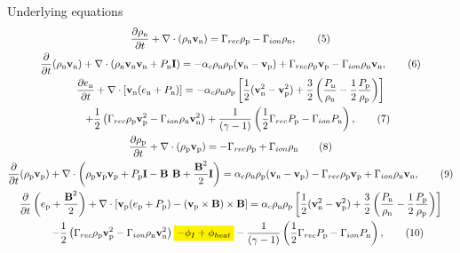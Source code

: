 \documentclass[10pt,aspectratio=169,usenames,dvipsnames]{beamer}
\newcommand{\mathcolorbox}[2]{\colorbox{#1}{$\displaystyle #2$}}
\begin{document}
\begin{frame}{Underlying equations}
\footnotesize
\begin{gather}
\frac{\partial \rho _{\text{n}}}{\partial t} + \nabla \cdot (\rho _{\text{n}} \textbf{v}_{\text{n}})= \Gamma _{rec} \rho _{\rm p} - \Gamma _{ion} \rho _{\rm n}, \label{eqn:neutral1}\tag{5} \\
\frac{\partial}{\partial t}(\rho _{\text{n}} \textbf{v}_{\text{n}}) + \nabla \cdot (\rho _{\text{n}} \textbf{v}_{\text{n}} \textbf{v}_{\text{n}} + P_{\text{n}} \textbf{I}) = -\alpha _c \rho_{\text{n}} \rho_{\text{p}} (\textbf{v}_{\text{n}}-\textbf{v}_{\text{p}}) + \Gamma _{rec} \rho _{\rm p} \textbf{v}_{\rm p} - \Gamma _{ion} \rho_{\rm n} \textbf{v}_{\rm n},\tag{6} \\
\frac{\partial e_{\text{n}}}{\partial t} + \nabla \cdot \left[\textbf{v}_{\text{n}} (e_{\text{n}} +P_{\text{n}}) \right] = -\alpha _c \rho _{\text{n}} \rho _{\text{p}} \left[ \frac{1}{2} (\textbf{v}_{\text{n}} ^2 - \textbf{v}_{\text{p}} ^2)+ \frac{3}{2} \left(\frac{P_{\rm n}}{\rho_{\rm n}}-\frac{1}{2}\frac{P_{\rm p}}{\rho_{\rm p}}\right) \right] \nonumber \\ \hspace{0.5cm}+ \frac{1}{2} \left( \Gamma _{rec} \rho _{\rm p} \textbf{v}_{\rm p} ^2 - \Gamma _{ion} \rho _{\rm n} \textbf{v}_{\rm n} ^2 \right) +\frac{1}{ (\gamma-1)} \left( \frac{1}{2} \Gamma _{rec} P_{\rm p} -\Gamma _{ion} P_{\rm n} \right), \tag{7}\\
\frac{\partial \rho _{\text{p}}}{\partial t} + \nabla \cdot (\rho_{\text{p}} \textbf{v}_{\text{p}}) = - \Gamma _{rec} \rho _{\rm p} + \Gamma _{ion} \rho _{\rm n} \label{eqn:plasma1}\tag{8}\\
\frac{\partial}{\partial t} (\rho_{\text{p}} \textbf{v}_{\text{p}})+ \nabla \cdot \left( \rho_{\text{p}} \textbf{v}_{\text{p}} \textbf{v}_{\text{p}} + P_{\text{p}} \textbf{I} - \textbf{B B} + \frac{\textbf{B}^2}{2} \textbf{I} \right) = \alpha _c \rho_{\text{n}} \rho_{\text{p}}(\textbf{v}_{\text{n}} - \textbf{v}_{\text{p}}) - \Gamma _{rec} \rho _{\rm p} \textbf{v}_{\rm p} + \Gamma _{ion} \rho_{\rm n} \textbf{v}_{\rm n},\tag{9}\\
\frac{\partial}{\partial t} \left( e_{\text{p}} + \frac{\textbf{B}^2}{2} \right) + \nabla \cdot \left[ \textbf{v}_{\text{p}} ( e_{\text{p}} + P_{\text{p}}) -  (\textbf{v}_{\rm p} \times \textbf{B}) \times \textbf{B} \right]  =  \alpha _c \rho _{\text{n}} \rho _{\text{p}} \left[ \frac{1}{2} (\textbf{v}_{\text{n}} ^2 - \textbf{v}_{\text{p}} ^2)+ \frac{3}{2} \left(\frac{P_{\rm n}}{\rho_{\rm n}}-\frac{1}{2}\frac{P_{\rm p}}{\rho_{\rm p}}\right) \right] \nonumber \\ \hspace{0.5cm}- \frac{1}{2} \left( \Gamma _{rec} \rho _{\rm p} \textbf{v}_{\rm p} ^2 - \Gamma _{ion} \rho _{\rm n} \textbf{v}_{\rm n} ^2 \right) \mathcolorbox{yellow}{- \phi_I + \phi_{heat}} -\frac{1}{ (\gamma-1)} \left( \frac{1}{2} \Gamma _{rec} P_{\rm p} -\Gamma _{ion} P_{\rm n} \right), \label{eqn:ep} \tag{10}\\

\end{gather}
\end{frame}
\end{document}
